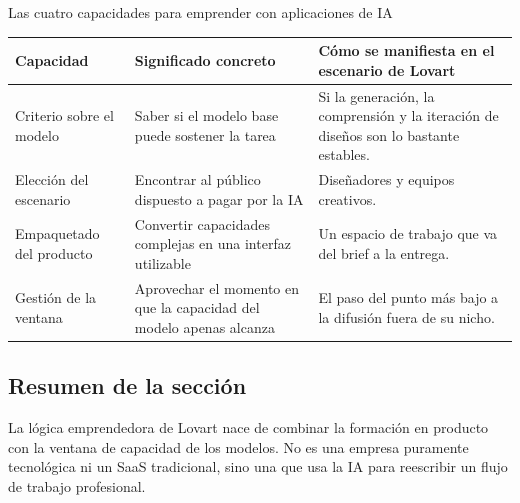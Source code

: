 \begin{knowledgebox}{Las cuatro capacidades para emprender con aplicaciones de IA}
\begin{tabularx}{\textwidth}{p{}p{}X}
\toprule
Capacidad & Significado concreto & Cómo se manifiesta en el escenario de Lovart \\
\midrule
Criterio sobre el modelo & Saber si el modelo base puede sostener la tarea & Si la generación, la comprensión y la iteración de diseños son lo bastante estables. \\
Elección del escenario & Encontrar al público dispuesto a pagar por la IA & Diseñadores y equipos creativos. \\
Empaquetado del producto & Convertir capacidades complejas en una interfaz utilizable & Un espacio de trabajo que va del brief a la entrega. \\
Gestión de la ventana & Aprovechar el momento en que la capacidad del modelo apenas alcanza & El paso del punto más bajo a la difusión fuera de su nicho. \\
\bottomrule
\end{tabularx}
\end{knowledgebox}

\subsection{Resumen de la sección}

La lógica emprendedora de Lovart nace de combinar la formación en producto con la ventana de capacidad de los modelos. No es una empresa puramente tecnológica ni un SaaS tradicional, sino una que usa la IA para reescribir un flujo de trabajo profesional.

